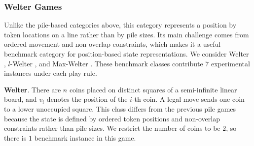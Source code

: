 \documentclass[review]{elsarticle}
\newcommand{\set}[1]{\{ #1 \}}
\newcommand{\tuple}[1]{\langle {#1} \rangle}
\newcommand{\true}{\top}
\newcommand{\statevar}{\mathcal{X}}
\newcommand{\act}{\mathcal{A}}
\newcommand{\constraint}{\mathcal{C}}
\newcommand{\estate}{\mathcal{E}}
\newcommand{\pre}{\mathtt{pre}}
\newcommand{\eff}{\mathtt{eff}}
\begin{document}
\subsubsection{Welter Games}
Unlike the pile-based categories above, this category represents a position by token locations on a line rather than by pile sizes.
Its main challenge comes from ordered movement and non-overlap constraints, which makes it a useful benchmark category for position-based state representations.
We consider Welter \cite{Wel1952}, $l$-Welter \cite{KahF1987}, and Max-Welter \cite{Ho2014}.
These benchmark classes contribute $7$ experimental instances under each play rule.

\textbf{Welter}. There are $n$ coins placed on distinct squares of a semi-infinite linear board, and $v_i$ denotes the position of the $i$-th coin.
A legal move sends one coin to a lower unoccupied square.
This class differs from the previous pile games because the state is defined by ordered token positions and non-overlap constraints rather than pile sizes.
We restrict the number of coins to be $2$, so there is $1$ benchmark instance in this game.
\end{document}
